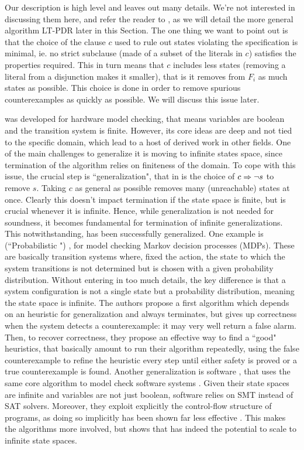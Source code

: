 Our description is high level and leaves out many details. We're not interested in discussing them here, and refer the reader to \cite{Bradley11}, as we will detail the more general algorithm LT-PDR later in this Section. The one thing we want to point out is that the choice of the clause $c$ used to rule out states violating the specification is minimal, ie. no strict subclause (made of a subset of the literals in $c$) satisfies the properties required. This in turn means that $c$ includes less states (removing a literal from a disjunction makes it smaller), that is it removes from $F_i$ as much states as possible. This choice is done in order to remove spurious counterexamples as quickly as possible. We will discuss this issue later.

 was developed for hardware model checking, that means variables are boolean and the transition system is finite. However, its core ideas are deep and not tied to the specific domain, which lead to a host of derived work in other fields. One of the main challenges to generalize it is moving to infinite states space, since termination of the algorithm relies on finiteness of the domain. To cope with this issue, the crucial step is ``generalization", that in  is the choice of $c \Rightarrow \lnot s$ to remove $s$. Taking $c$ as general as possible removes many (unreachable) states at once. Clearly this doesn't impact termination if the state space is finite, but is crucial whenever it is infinite. Hence, while generalization is not needed for soundness, it becomes fundamental for termination of infinite generalizations.
This notwithstanding,  has been successfully generalized. One example is  (``Probabilistic ") \cite{BJKKMS20}, for model checking Markov decision processes (MDPs). These are basically transition systems where, fixed the action, the state to which the system transitions is not determined but is chosen with a given probability distribution. Without entering in too much details, the key difference is that a system configuration is not a single state but a probability distribution, meaning the state space is infinite. The authors propose a first algorithm which depends on an heuristic for generalization and always terminates, but gives up correctness when the system detects a counterexample: it may very well return a false alarm. Then, to recover correctness, they propose an effective way to find a ``good" heuristics, that basically amount to run their algorithm repeatedly, using the false counterexample to refine the heuristic every step until either safety is proved or a true counterexample is found.
Another generalization is software , that uses the same core algorithm to model check software systems \cite{CG12,LNNK20}. Given their state spaces are infinite and variables are not just boolean, software  relies on SMT instead of SAT solvers. Moreover, they exploit explicitly the control-flow structure of programs, as doing so implicitly has been shown far less effective \cite{CG12}. This makes the algorithms more involved, but shows that  has indeed the potential to scale to infinite state spaces.

